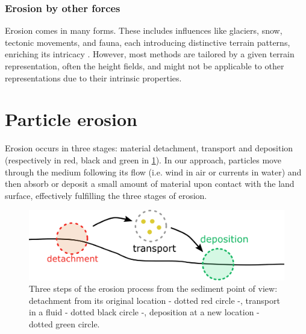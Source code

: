 \subsubsection{Erosion by other forces}
Erosion comes in many forms. These includes influences like glaciers, snow, tectonic movements, and fauna, each introducing distinctive terrain patterns, enriching its intricacy \cite{Cordonnier2016,Cordonnier2017a,Cordonnier2018,Cordonnier2017b,Argudo2020}. However, most methods are tailored by a given terrain representation, often the height fields, and might not be applicable to other representations due to their intrinsic properties.

\section{Particle erosion}%
\label{sec:erosion_method}
Erosion occurs in three stages: material detachment, transport and deposition (respectively in red, black and green in \cref{fig:erosion_ablation_erosion}). In our approach, particles move through the medium following its flow (i.e. wind in air or currents in water) and then absorb or deposit a small amount of material upon contact with the land surface, effectively fulfilling the three stages of erosion.
\begin{figure}[ht]
\centering
\includegraphics[width=0.95\linewidth]{figures/ablation_erosion.pdf}
\caption{Three steps of the erosion process from the sediment point of view: detachment from its original location - dotted red circle -, transport in a fluid - dotted black circle -, deposition at a new location - dotted green circle.}
\label{fig:erosion_ablation_erosion}

\end{figure}

